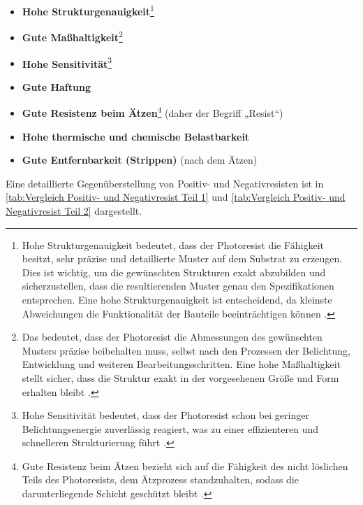\documentclass{article} %
\begin{document}
\begin{itemize}
    \item \textbf{Hohe Strukturgenauigkeit}\footnote{Hohe Strukturgenauigkeit bedeutet, dass der Photoresist die Fähigkeit besitzt, sehr präzise und detaillierte Muster auf dem Substrat zu erzeugen. Dies ist wichtig, um die gewünschten Strukturen exakt abzubilden und sicherzustellen, dass die resultierenden Muster genau den Spezifikationen entsprechen. Eine hohe Strukturgenauigkeit ist entscheidend, da kleinste Abweichungen die Funktionalität der Bauteile beeinträchtigen können \cite{madou2002, wolf2000, sciencedirect_photoresist}.}
    \item \textbf{Gute Maßhaltigkeit}\footnote{Das bedeutet, dass der Photoresist die Abmessungen des gewünschten Musters präzise beibehalten muss, selbst nach den Prozessen der Belichtung, Entwicklung und weiteren Bearbeitungsschritten. Eine hohe Maßhaltigkeit stellt sicher, dass die Struktur exakt in der vorgesehenen Größe und Form erhalten bleibt \cite{madou2002, wolf2000}.}
    \item \textbf{Hohe Sensitivität}\footnote{Hohe Sensitivität bedeutet, dass der Photoresist schon bei geringer Belichtungsenergie zuverlässig reagiert, was zu einer effizienteren und schnelleren Strukturierung führt \cite{madou2002, sciencedirect_photoresist}.}
    \item \textbf{Gute Haftung}
    \item \textbf{Gute Resistenz beim Ätzen}\footnote{Gute Resistenz beim Ätzen bezieht sich auf die Fähigkeit des nicht löslichen Teils des Photoresists, dem Ätzprozess standzuhalten, sodass die darunterliegende Schicht geschützt bleibt \cite{madou2002, wolf2000}.} (daher der Begriff „Resist“)
    \item \textbf{Hohe thermische und chemische Belastbarkeit}
    \item \textbf{Gute Entfernbarkeit (Strippen)} (nach dem Ätzen)
\end{itemize}

\vspace{1em}

Eine detaillierte Gegenüberstellung von Positiv- und Negativresisten ist in \autoref{tab:Vergleich Positiv- und Negativresist Teil 1} und \autoref{tab:Vergleich Positiv- und Negativresist Teil 2} dargestellt.
\end{document}
